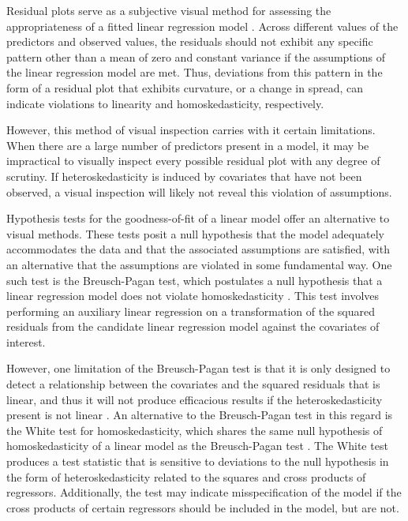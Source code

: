 \documentclass[submit]{smj}
\begin{document}
		Residual plots serve as a subjective visual method for assessing the appropriateness of a fitted linear regression model \citep{Miles}. Across different values
		of the predictors and observed values, the residuals should not exhibit any specific pattern other than a mean of zero and constant variance if the assumptions of the linear regression model are met.
		Thus, deviations from this pattern in the form of a residual plot that exhibits curvature, or a change in spread, can indicate violations to linearity and homoskedasticity, respectively. 

		However, this method of visual inspection carries with it certain limitations. When there are a large number of predictors present in a model, it may be impractical to visually inspect every
		possible residual plot with any degree of scrutiny. If heteroskedasticity is induced by covariates that have not been observed, a visual inspection will likely
		not reveal this violation of assumptions.

		Hypothesis tests for the goodness-of-fit of a linear model offer an alternative to visual methods. These tests posit a null hypothesis that the model adequately accommodates the data and that
		the associated assumptions are satisfied, with an alternative that the assumptions are violated in some fundamental way. One such test is the Breusch-Pagan test, which postulates a null hypothesis
		that a linear regression model does not violate homoskedasticity \citep{Breusch}. This test involves performing an auxiliary linear regression on a transformation of the squared residuals from
		the candidate linear regression model against the covariates of interest.

		However, one limitation of the Breusch-Pagan test is that it is only designed to detect a relationship between the covariates and the squared residuals that is linear, and thus it will not
		produce efficacious results if the heteroskedasticity present is not linear \citep{Waldman}. An alternative to the Breusch-Pagan test in this regard is the White test for homoskedasticity,
		which shares the same null hypothesis of homoskedasticity of a linear model as the Breusch-Pagan test \citep{White1980}. The White test produces a test statistic that is sensitive to deviations to
		the null hypothesis in the form of heteroskedasticity related to the squares and cross products of regressors. Additionally, the test may indicate misspecification of the model if the cross products
		of certain regressors should be included in the model, but are not.
\end{document}
